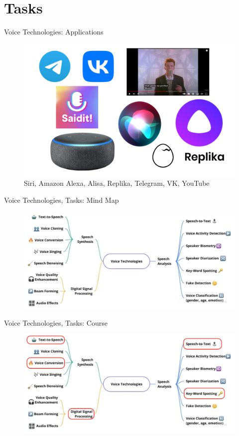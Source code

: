 \section{Tasks}
\begin{frame}{Voice Technologies: Applications}
	\begin{figure}
		\centering
		\includegraphics[width=0.99\linewidth]{figs/applications.png}
		\caption{Siri, Amazon Alexa, Alisa, Replika, Telegram, VK, YouTube}
	\end{figure}
\end{frame}
\begin{frame}{Voice Technologies, Tasks: Mind Map}
	\begin{figure}
		\centering
		\includegraphics[width=1.03\linewidth]{figs/tasks_1.png}
	\end{figure}
\end{frame}
\begin{frame}{Voice Technologies, Tasks: Course}
	\begin{figure}
		\centering
		\includegraphics[width=1.03\linewidth]{figs/tasks_1_course.png}
	\end{figure}
\end{frame}
